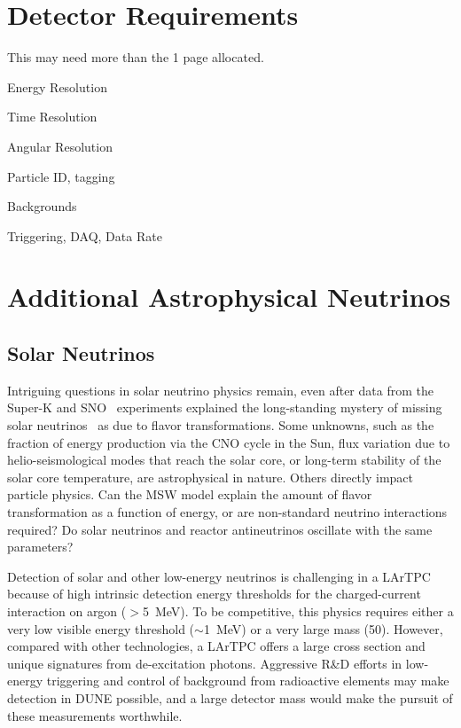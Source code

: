 
\section{Detector Requirements}
\label{sec:physics-snblowe-detector-requirements}

This may need more than the 1 page allocated.

Energy Resolution

Time Resolution

Angular Resolution

Particle ID, tagging

Backgrounds

Triggering, DAQ, Data Rate


\section{Additional Astrophysical Neutrinos}
\label{sec:physics-snblowe-other}

\subsection{Solar Neutrinos}

Intriguing questions in solar neutrino physics remain,
even after data
from the Super-K and SNO~\cite{Fukuda:2001nj,Ahmad:2001an}
experiments explained the long-standing mystery of missing solar
neutrinos~\cite{Cleveland:1998nv} as due to flavor
transformations. 
Some unknowns, such as the fraction of energy production via the CNO
cycle in the Sun, flux variation due to helio-seismological modes that
reach the solar core, or long-term stability of the solar core
temperature, are astrophysical in nature. Others directly impact
particle physics. Can the MSW model explain the amount of flavor
transformation as a function of energy, or are non-standard neutrino
interactions required?  Do solar neutrinos and reactor antineutrinos
oscillate with the same parameters? 

Detection of solar and other low-energy neutrinos is challenging in
a LArTPC because of high intrinsic detection energy thresholds for
the charged-current interaction on argon ($>$\SI{5}{\MeV}). To be
competitive, this physics requires either a very low visible energy
threshold ($\sim$\SI{1}{\MeV}) or a very large mass (\SI{50}{\kt}).
However, compared with other technologies, a LArTPC offers a large
cross section and unique signatures from de-excitation
photons. Aggressive R\&D efforts in low-energy triggering and
control of background from radioactive elements may make detection
in DUNE possible, and a large detector mass would make the pursuit
of these measurements worthwhile.

